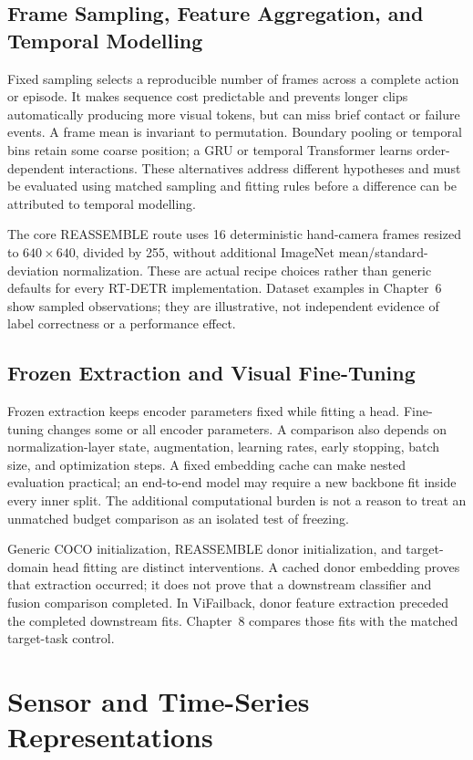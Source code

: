 \subsection{Frame Sampling, Feature Aggregation, and Temporal Modelling}
Fixed sampling selects a reproducible number of frames across a complete action or episode. It makes sequence cost predictable and prevents longer clips automatically producing more visual tokens, but can miss brief contact or failure events. A frame mean is invariant to permutation. Boundary pooling or temporal bins retain some coarse position; a GRU or temporal Transformer learns order-dependent interactions. These alternatives address different hypotheses and must be evaluated using matched sampling and fitting rules before a difference can be attributed to temporal modelling.

The core REASSEMBLE route uses 16 deterministic hand-camera frames resized to $640\times640$, divided by 255, without additional ImageNet mean/standard-deviation normalization. These are actual recipe choices rather than generic defaults for every RT-DETR implementation. Dataset examples in Chapter~6 show sampled observations; they are illustrative, not independent evidence of label correctness or a performance effect.

\subsection{Frozen Extraction and Visual Fine-Tuning}
Frozen extraction keeps encoder parameters fixed while fitting a head. Fine-tuning changes some or all encoder parameters. A comparison also depends on normalization-layer state, augmentation, learning rates, early stopping, batch size, and optimization steps. A fixed embedding cache can make nested evaluation practical; an end-to-end model may require a new backbone fit inside every inner split. The additional computational burden is not a reason to treat an unmatched budget comparison as an isolated test of freezing.

Generic COCO initialization, REASSEMBLE donor initialization, and target-domain head fitting are distinct interventions. A cached donor embedding proves that extraction occurred; it does not prove that a downstream classifier and fusion comparison completed. In ViFailback, donor feature extraction preceded the completed downstream fits. Chapter~8 compares those fits with the matched target-task control.

\section{Sensor and Time-Series Representations}
